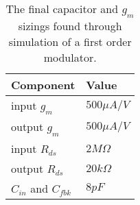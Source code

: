 \begin{table}
    \begin{center}
    \caption{The final capacitor and $g_{m}$ sizings found through simulation of a first order modulator.}
    \label{tab:finalsizing}
    \begin{tabular}{l p{}} 
    \toprule
    Component  & Value \\
    \midrule
    input $g_{m}$ & $500\mu A/V$ \\
    output $g_{m}$ & $500\mu A/V$ \\
    input $R_{ds}$ & $2M\Omega$ \\
    output $R_{ds}$ & $20k\Omega$ \\
    $C_{in}$ and $C_{fbk}$ & $8pF$ \\
    \end{tabular}
    \end{center}
\end{table}
